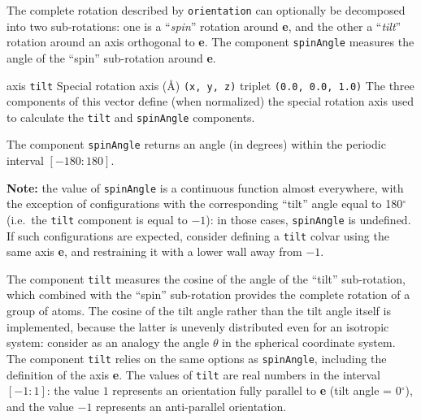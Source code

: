 The complete rotation described by \texttt{orientation} can optionally be decomposed into two sub-rotations: one is a ``\emph{spin}'' rotation around \textbf{e}, and the other a ``\emph{tilt}'' rotation around an axis orthogonal to \textbf{e}.
The component \texttt{spinAngle} measures the angle of the ``spin'' sub-rotation around \textbf{e}.

\begin{cvcoptions}
\item %
\item %
\item %
\item %
  \keydef
    {axis}{%
    \texttt{tilt}}{%
    Special rotation axis (\AA{})}{%
    \texttt{(x, y, z)} triplet}{%
    \texttt{(0.0, 0.0, 1.0)}}{%
    The three components of this vector define (when normalized) the special rotation axis used to calculate the \texttt{tilt} and \texttt{spinAngle} components.}
\end{cvcoptions}
The component \texttt{spinAngle} returns an angle (in degrees) within the periodic interval $[-180:180]$.

\textbf{Note:} the value of \texttt{spinAngle} is a continuous function almost everywhere, with the exception of configurations with the corresponding ``tilt'' angle equal to 180$^\circ$ (i.e.~the \texttt{tilt} component is equal to $-1$): in those cases, \texttt{spinAngle} is undefined.  If such configurations are expected, consider defining a \texttt{tilt} colvar using the same axis \textbf{e}, and restraining it with a lower wall away from $-1$.



The component \texttt{tilt} measures the cosine of the angle of the ``tilt'' sub-rotation, which combined with the ``spin'' sub-rotation provides the complete rotation of a group of atoms.
The cosine of the tilt angle rather than the tilt angle itself is implemented, because the latter is unevenly distributed even for an isotropic system: consider as an analogy the angle $\theta$ in the spherical coordinate system.
The component \texttt{tilt} relies on the same options as \texttt{spinAngle}, including the definition of the axis \textbf{e}.
The values of \texttt{tilt} are real numbers in the interval $[-1:1]$: the value $1$ represents an orientation fully parallel to \textbf{e} (tilt angle = 0$^\circ$), and the value $-1$ represents an anti-parallel orientation.

